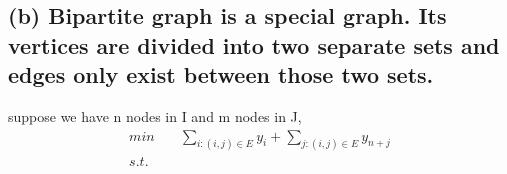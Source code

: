 \documentclass[a4paper,12pt]{journal}
\begin{document}
	\subsection*{(b) Bipartite graph is a special graph. Its vertices are divided into two separate sets and edges only exist between those two sets.}
	suppose we have n nodes in I and m nodes in J, 
	\begin{equation}
		\begin{aligned}
			min\quad &\sum_{i:(i,j)\in E}y_i+\sum_{j:(i,j)\in E}y_{n+j}\\
			s.t.\quad &
		\end{aligned}
	\end{equation}
\end{document}
